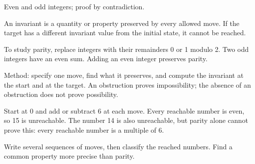 \documentclass[11pt]{article}
\begin{document}
Even and odd integers; proof by contradiction.\par
{}
An invariant is a quantity or property preserved by every allowed move. If the target has a different invariant value from the initial state, it cannot be reached.\par
To study parity, replace integers with their remainders 0 or 1 modulo 2. Two odd integers have an even sum. Adding an even integer preserves parity.\par
Method: specify one move, find what it preserves, and compute the invariant at the start and at the target. An obstruction proves impossibility; the absence of an obstruction does not prove possibility.\par
{}
Start at 0 and add or subtract 6 at each move. Every reachable number is even, so 15 is unreachable. The number 14 is also unreachable, but parity alone cannot prove this: every reachable number is a multiple of 6.\par
{}
Write several sequences of moves, then classify the reached numbers. Find a common property more precise than parity.\par
\end{document}
